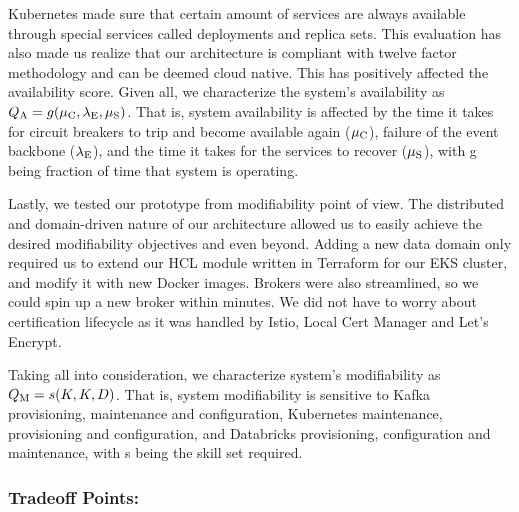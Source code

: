 \documentclass[conference]{IEEEtran}
\begin{document}


Kubernetes made sure that certain amount of services are always available through special services called deployments and replica sets. This evaluation has also made us realize that our architecture is compliant with twelve factor methodology and can be deemed cloud native. This has positively affected the availability score. Given all, we characterize the system's availability as $Q\textsubscript{A} = g(\mu\textsubscript{C}, \lambda\textsubscript{E}, \mu\textsubscript{S})$. That is, system availability is affected by the time it takes for circuit breakers to trip and become available again ($\mu\textsubscript{C}$), failure of the event backbone ($\lambda\textsubscript{E}$), and the time it takes for the services to recover ($\mu\textsubscript{S}$), with g being fraction of time that system is operating.

Lastly, we tested our prototype from modifiability point of view. The distributed and domain-driven nature of our architecture allowed us to easily achieve the desired modifiability objectives and even beyond. Adding a new data domain only required us to extend our HCL module written in Terraform for our EKS cluster, and modify it with new Docker images. Brokers were also streamlined, so we could spin up a new broker within minutes. We did not have to worry about certification lifecycle as it was handled by Istio, Local Cert Manager and Let's Encrypt. 


Taking all into consideration, we characterize system's modifiability as $ Q\textsubscript{M} = s(K, K, D)$. That is, system modifiability is sensitive to Kafka provisioning, maintenance and configuration, Kubernetes maintenance, provisioning and configuration, and Databricks provisioning, configuration and maintenance, with s being the skill set required. 

\subsubsection{Tradeoff Points:}
\end{document}

